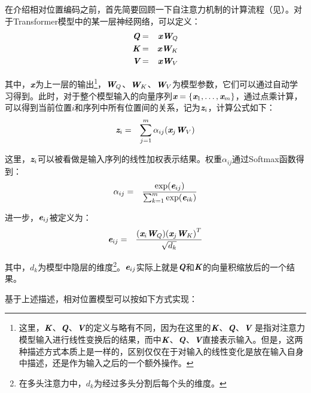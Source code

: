 \parinterval 在介绍相对位置编码之前，首先简要回顾一下自注意力机制的计算流程（见{\chaptertwelve}）。对于Transformer模型中的某一层神经网络，可以定义：
\begin{eqnarray}
\textbf{\em Q} & = & \textbf{\em x} \textbf{\em W}_Q \\
\textbf{\em K} & = & \textbf{\em x} \textbf{\em W}_K \\
\textbf{\em V} & = & \textbf{\em x} \textbf{\em W}_V
\label{eq:15-3}
\end{eqnarray}

\noindent 其中，$\textbf{\em x}$为上一层的输出\footnote[2]{这里，$\textbf{\em K}$、$\textbf{\em Q}$、$\textbf{\em V}$的定义与{\chaptertwelve}略有不同，因为在这里的$\textbf{\em K}$、$\textbf{\em Q}$、$\textbf{\em V}$ 是指对注意力模型输入进行线性变换后的结果，而{\chaptertwelve}中$\textbf{\em K}$、$\textbf{\em Q}$、$\textbf{\em V}$直接表示输入。但是，这两种描述方式本质上是一样的，区别仅仅在于对输入的线性变化是放在输入自身中描述，还是作为输入之后的一个额外操作。}，$\textbf{\em W}_Q$、$\textbf{\em W}_K$、$\textbf{\em W}_V$为模型参数，它们可以通过自动学习得到。此时，对于整个模型输入的向量序列$\textbf{\em x}=\{\textbf{\em x}_1,\ldots,\textbf{\em x}_m\}$，通过点乘计算，可以得到当前位置$i$和序列中所有位置间的关系，记为$\textbf{\em z}_{i} $，计算公式如下：
\begin{eqnarray}
\textbf{\em z}_{i} &=& \sum_{j=1}^m \alpha_{ij}(\textbf{\em x}_j \textbf{\em W}_V)
\label{eq:15-4}
\end{eqnarray}

\noindent 这里，$\textbf{\em z}_{i}$可以被看做是输入序列的线性加权表示结果。权重$\alpha_{ij}$通过Softmax函数得到：
\begin{eqnarray}
\alpha_{ij} &=& \frac{\exp (\textbf{\em e}_{ij})}{\sum_{k=1}^{m}\exp (\textbf{\em e}_{ik})}
\label{eq:15-5}
\end{eqnarray}

\noindent 进一步，$\textbf{\em e}_{ij}$被定义为：
\begin{eqnarray}
\textbf{\em e}_{ij} &=& \frac{(\textbf{\em x}_i \textbf{\em W}_Q){(\textbf{\em x}_j \textbf{\em W}_K)}^{T}}{\sqrt{d_k}}
\label{eq:15-6}
\end{eqnarray}

\noindent 其中，$d_k$为模型中隐层的维度\footnote[3]{在多头注意力中，$d_k$为经过多头分割后每个头的维度。}。$\textbf{\em e}_{ij}$实际上就是$\textbf{\em Q}$和$\textbf{\em K}$的向量积缩放后的一个结果。

\parinterval 基于上述描述，相对位置模型可以按如下方式实现：

